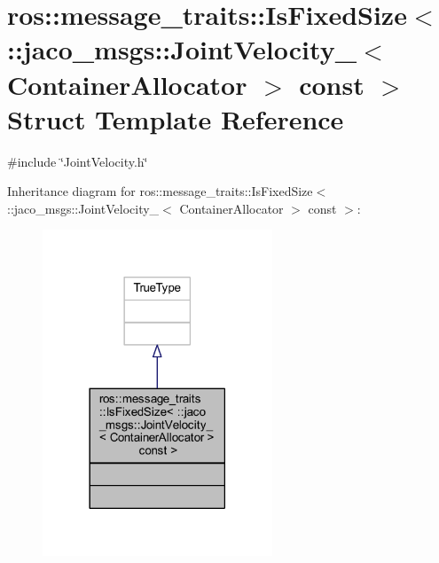 \hypertarget{structros_1_1message__traits_1_1IsFixedSize_3_01_1_1jaco__msgs_1_1JointVelocity___3_01ContainerAllocator_01_4_01const_01_01_4}{}\section{ros\+:\+:message\+\_\+traits\+:\+:Is\+Fixed\+Size$<$ \+:\+:jaco\+\_\+msgs\+:\+:Joint\+Velocity\+\_\+$<$ Container\+Allocator $>$ const $>$ Struct Template Reference}
\label{structros_1_1message__traits_1_1IsFixedSize_3_01_1_1jaco__msgs_1_1JointVelocity___3_01ContainerAllocator_01_4_01const_01_01_4}


{\ttfamily \#include \char`\"{}Joint\+Velocity.\+h\char`\"{}}



Inheritance diagram for ros\+:\+:message\+\_\+traits\+:\+:Is\+Fixed\+Size$<$ \+:\+:jaco\+\_\+msgs\+:\+:Joint\+Velocity\+\_\+$<$ Container\+Allocator $>$ const $>$\+:
\nopagebreak
\begin{figure}[H]
\begin{center}
\leavevmode
\includegraphics[width=194pt]{d7/df8/structros_1_1message__traits_1_1IsFixedSize_3_01_1_1jaco__msgs_1_1JointVelocity___3_01ContainerA0dbd70e6278c363760f34e151738f830}
\end{center}
\end{figure}


